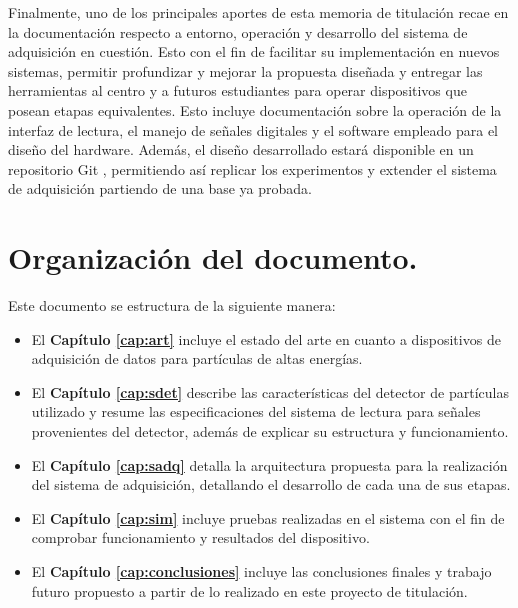 	Finalmente, uno de los principales aportes de esta memoria de titulación recae en la documentación respecto a entorno, operación y desarrollo del sistema de adquisición en cuestión. Esto con el fin de facilitar su implementación en nuevos sistemas, permitir profundizar y mejorar la propuesta diseñada y entregar las herramientas al centro y a futuros estudiantes para operar dispositivos que posean etapas equivalentes. Esto incluye documentación sobre la operación de la interfaz de lectura, el manejo de señales digitales y el software empleado para el diseño del hardware. Además, el diseño desarrollado estará disponible en un repositorio Git \cite{GonzalezMuonRepository}, permitiendo así replicar los experimentos y extender el sistema de adquisición partiendo de una base ya probada.

\section{Organización del documento.}

	Este documento se estructura de la siguiente manera:
	
	\begin{itemize}
		\item El \textbf{Capítulo \ref{cap:art}} incluye el estado del arte en cuanto a dispositivos de adquisición de datos para partículas de altas energías.
		\item El \textbf{Capítulo \ref{cap:sdet}} describe las características del detector de partículas utilizado y resume las especificaciones del sistema de lectura para señales provenientes del detector, además de explicar su estructura y funcionamiento.
		\item El \textbf{Capítulo \ref{cap:sadq}} detalla la arquitectura propuesta para la realización del sistema de adquisición, detallando el desarrollo de cada una de sus etapas.
		\item El \textbf{Capítulo \ref{cap:sim}} incluye pruebas realizadas en el sistema con el fin de comprobar funcionamiento y resultados del dispositivo.
		\item El \textbf{Capítulo \ref{cap:conclusiones}} incluye las conclusiones finales y trabajo futuro propuesto a partir de lo realizado en este proyecto de titulación.
	\end{itemize}

